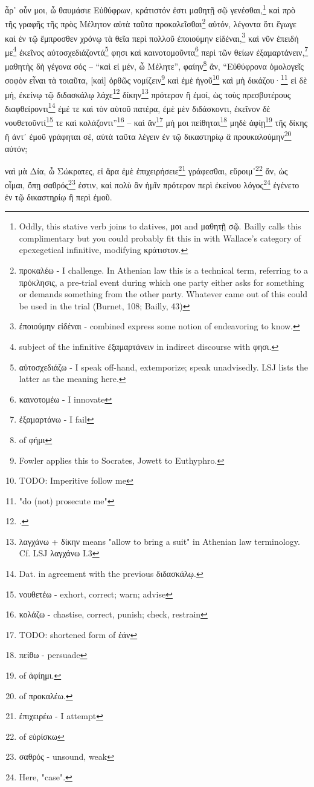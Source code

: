 ἆρ᾽
οὖν
μοι,
ὦ
θαυμάσιε
Εὐθύφρων,
κράτιστόν
ἐστι
μαθητῇ
σῷ
γενέσθαι,\footnote{Oddly, this stative verb joins to datives, μοι and μαθητῇ σῷ. Bailly calls this complimentary but you could probably fit this in with Wallace's category of epexegetical infinitive, modifying κράτιστον.}
καὶ
πρὸ
τῆς
γραφῆς
τῆς
πρὸς
Μέλητον
αὐτὰ
ταῦτα
προκαλεῖσθαι\footnote{προκαλέω - I challenge. In Athenian law this is a technical term, referring to a πρόκλησις, a pre-trial event during which one party either asks for something or demands something from the other party. Whatever came out of this could be used in the trial (Burnet, 108; Bailly, 43)}
αὐτόν,
λέγοντα
ὅτι
ἔγωγε
καὶ
ἐν
τῷ
ἔμπροσθεν
χρόνῳ
τὰ
θεῖα
περὶ
πολλοῦ
ἐποιούμην
εἰδέναι,\footnote{ἐποιούμην εἰδέναι - combined express some notion of endeavoring to know.}
καὶ
νῦν
ἐπειδή
με\footnote{subject of the infinitive ἐξαμαρτάνειν in indirect discourse with φησι.}
ἐκεῖνος
αὐτοσχεδιάζοντά\footnote{αὐτοσχεδιάζω - I speak off-hand, extemporize; speak unadvisedly. LSJ lists the latter as the meaning here.}
φησι
καὶ
καινοτομοῦντα\footnote{καινοτομέω - I innovate}
περὶ
τῶν
θείων
ἐξαμαρτάνειν,\footnote{ἐξαμαρτάνω - I fail}
μαθητὴς
δὴ
γέγονα
σός
--
“καὶ
εἰ
μέν,
ὦ
Μέλητε”,
φαίην\footnote{ of φήμι}
ἄν,
“Εὐθύφρονα
ὁμολογεῖς
\versification{[5b]}
σοφὸν
εἶναι
τὰ
τοιαῦτα,
[καὶ]
ὀρθῶς
νομίζειν\footnote{Fowler applies this to Socrates, Jowett to Euthyphro. }
καὶ
ἐμὲ
ἡγοῦ\footnote{TODO: Imperitive follow me}
καὶ
μὴ
δικάζου·\footnote{"do (not) prosecute me"}
εἰ
δὲ
μή,
ἐκείνῳ
τῷ
διδασκάλῳ
λάχε\footnote{.}
δίκην\footnote{λαγχάνω + δίκην means "allow to bring a suit" in Athenian law terminology. Cf. LSJ λαγχάνω I.3}
πρότερον
ἢ
ἐμοί,
ὡς
τοὺς
πρεσβυτέρους
διαφθείροντι\footnote{Dat. in agreement with the previous διδασκάλῳ.}
ἐμέ
τε
καὶ
τὸν
αὑτοῦ
πατέρα,
ἐμὲ
μὲν
διδάσκοντι,
ἐκεῖνον
δὲ
νουθετοῦντί\footnote{νουθετέω - exhort, correct; warn; advise}
τε
καὶ
κολάζοντι”\footnote{κολάζω - chastise, correct, punish; check, restrain}
--
καὶ
ἂν\footnote{TODO: shortened form of ἐάν}
μή
μοι
πείθηται\footnote{πείθω - persuade}
μηδὲ
ἀφίῃ\footnote{ of ἀφίημι.}
τῆς
δίκης
ἢ
ἀντ᾽
ἐμοῦ
γράφηται
σέ,
αὐτὰ
ταῦτα
λέγειν
ἐν
τῷ
δικαστηρίῳ
ἃ
προυκαλούμην\footnote{ of προκαλέω.}
αὐτόν;

ναὶ
μὰ
Δία,
ὦ
Σώκρατες,
εἰ
ἄρα
ἐμὲ
ἐπιχειρήσειε\footnote{ἐπιχειρέω - I attempt}
\versification{[5c]}
γράφεσθαι,
εὕροιμ᾽\footnote{ of εὑρίσκω}
ἄν,
ὡς
οἶμαι,
ὅπῃ
σαθρός\footnote{σαθρός - unsound, weak}
ἐστιν,
καὶ
πολὺ
ἂν
ἡμῖν
πρότερον
περὶ
ἐκείνου
λόγος\footnote{Here, "case".}
ἐγένετο
ἐν
τῷ
δικαστηρίῳ
ἢ
περὶ
ἐμοῦ.

